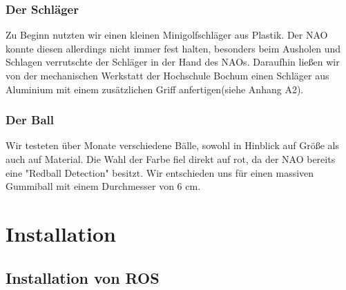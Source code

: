 \documentclass{scrartcl}
\begin{document}
\subsubsection{Der Schläger}
Zu Beginn nutzten wir einen kleinen Minigolfschläger aus Plastik. Der NAO konnte diesen allerdings nicht  immer fest halten, besonders beim Ausholen und Schlagen verrutschte der Schläger in der Hand des NAOs. Daraufhin ließen wir von der mechanischen Werkstatt der Hochschule Bochum einen Schläger aus Aluminium mit einem zusätzlichen Griff anfertigen(siehe Anhang A2).

\subsubsection{Der Ball}
Wir testeten über Monate verschiedene Bälle, sowohl in Hinblick auf Größe als auch auf Material. Die Wahl der Farbe fiel direkt auf rot, da der NAO bereits eine "Redball Detection" besitzt. Wir entschieden uns für einen massiven Gummiball mit einem Durchmesser von 6 cm.  


\section{Installation}


\subsection{Installation von ROS}
\end{document}
